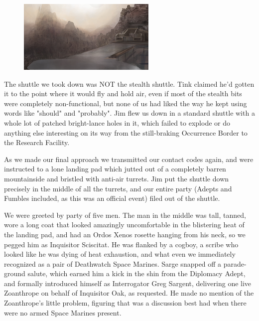 \begin{figure}
	\begin{center}
		\includegraphics[width=\figwidth]{pics/15/75.png}
	\end{center}
\end{figure}
The shuttle we took down was NOT the stealth shuttle. 
Tink claimed he'd gotten it to the point where it would fly and hold air, even if most of the stealth bits were completely non-functional, but none of us had liked the way he kept using words like "should" and "probably". 
Jim flew us down in a standard shuttle with a whole lot of patched bright-lance holes in it, which failed to explode or do anything else interesting on its way from the still-braking Occurrence Border to the Research Facility. 


As we made our final approach we transmitted our contact codes again, and were instructed to a lone landing pad which jutted out of a completely barren mountainside and bristled with anti-air turrets. 
Jim put the shuttle down precisely in the middle of all the turrets, and our entire party (Adepts and Fumbles included, as this was an official event) filed out of the shuttle. 


We were greeted by party of five men. 
The man in the middle was tall, tanned, wore a long coat that looked amazingly uncomfortable in the blistering heat of the landing pad, and had an Ordos Xenos rosette hanging from his neck, so we pegged him as Inquisitor Sciscitat. 
He was flanked by a cogboy, a scribe who looked like he was dying of heat exhaustion, and what even we immediately recognized as a pair of Deathwatch Space Marines. 
Sarge snapped off a parade-ground salute, which earned him a kick in the shin from the Diplomacy Adept, and formally introduced himself as Interrogator Greg Sargent, delivering one live Zoanthrope on behalf of Inquisitor Oak, as requested. 
He made no mention of the Zoanthrope's little problem, figuring that was a discussion best had when there were no armed Space Marines present.


